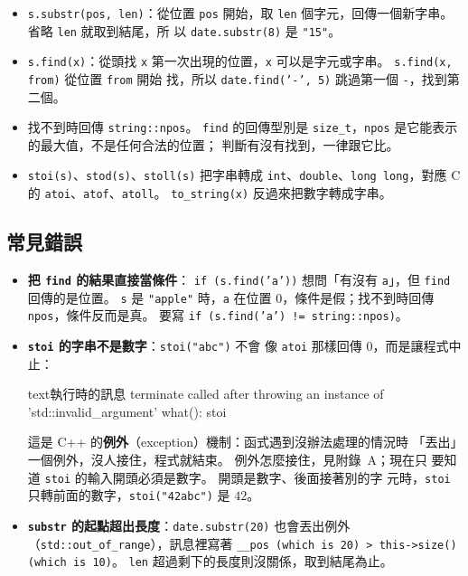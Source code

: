 
\begin{itemize}
\item \texttt{s.substr(pos, len)}：從位置 \texttt{pos} 開始，取
\texttt{len} 個字元，回傳一個新字串。 省略 \texttt{len} 就取到結尾，所
以 \texttt{date.substr(8)} 是 \texttt{"15"}。
\item \texttt{s.find(x)}：從頭找 \texttt{x} 第一次出現的位置，\texttt{x}
可以是字元或字串。 \texttt{s.find(x, from)} 從位置 \texttt{from} 開始
找，所以 \texttt{date.find('-', 5)} 跳過第一個 \texttt{-}，找到第二個。
\item 找不到時回傳 \texttt{string::npos}。 \texttt{find} 的回傳型別是
\texttt{size\_t}，\texttt{npos} 是它能表示的最大值，不是任何合法的位置；
判斷有沒有找到，一律跟它比。
\item \texttt{stoi(s)}、\texttt{stod(s)}、\texttt{stoll(s)} 把字串轉成
\texttt{int}、\texttt{double}、\texttt{long long}，對應 C 的
\texttt{atoi}、\texttt{atof}、\texttt{atoll}。 \texttt{to\_string(x)}
反過來把數字轉成字串。
\end{itemize}

\subsection{常見錯誤}

\begin{itemize}
\item \textbf{把 \texttt{find} 的結果直接當條件}：
\texttt{if (s.find('a'))} 想問「有沒有 \texttt{a}」，但 \texttt{find}
回傳的是位置。 \texttt{s} 是 \texttt{"apple"} 時，\texttt{a} 在位置
$0$，條件是假；找不到時回傳 \texttt{npos}，條件反而是真。 要寫
\texttt{if (s.find('a') != string::npos)}。
\item \textbf{\texttt{stoi} 的字串不是數字}：\texttt{stoi("abc")} 不會
像 \texttt{atoi} 那樣回傳 $0$，而是讓程式中止：
\begin{code}{text}{執行時的訊息}
terminate called after throwing an instance of 'std::invalid_argument'
  what():  stoi
\end{code}
這是 C++ 的\textbf{例外}（exception）機制：函式遇到沒辦法處理的情況時
「丟出」一個例外，沒人接住，程式就結束。 例外怎麼接住，見附錄~A；現在只
要知道 \texttt{stoi} 的輸入開頭必須是數字。 開頭是數字、後面接著別的字
元時，\texttt{stoi} 只轉前面的數字，\texttt{stoi("42abc")} 是 $42$。
\item \textbf{\texttt{substr} 的起點超出長度}：\texttt{date.substr(20)}
也會丟出例外（\texttt{std::out\_of\_range}），訊息裡寫著
\texttt{\_\_pos (which is 20) > this->size() (which is 10)}。
\texttt{len} 超過剩下的長度則沒關係，取到結尾為止。
\end{itemize}

